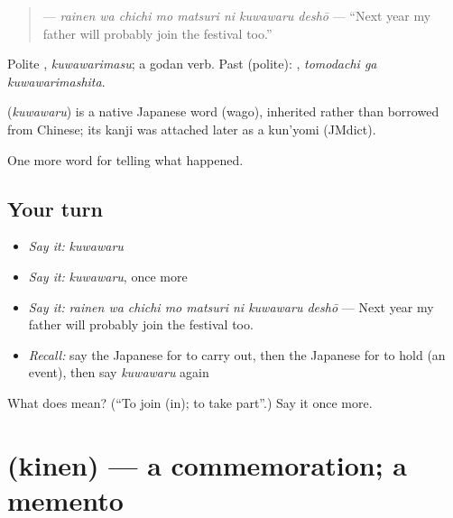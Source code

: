 \begin{quote}
\textbf{   } — \emph{rainen wa chichi mo matsuri ni kuwawaru deshō} — \textquotedblleft{}Next year my father will probably join the festival too.\textquotedblright{}
\end{quote}

Polite \textbf{}, \emph{kuwawarimasu}; a godan verb. Past (polite): \textbf{ }, \emph{tomodachi ga kuwawarimashita}.

\begin{cousinweb}
\textbf{} (\emph{kuwawaru}) is a native Japanese word (wago), inherited rather than borrowed from Chinese; its kanji was attached later as a kun'yomi (JMdict).
\end{cousinweb}

\begin{grammarlens}[title={What you've built}]
One more word for telling what happened.
\end{grammarlens}

\subsection*{Your turn}
\begin{itemize}
\raggedright
  \item \emph{Say it:} \emph{kuwawaru}
  \item \emph{Say it:} \emph{kuwawaru}, once more
  \item \emph{Say it:} \emph{rainen wa chichi mo matsuri ni kuwawaru deshō} — Next year my father will probably join the festival too.
  \item \emph{Recall:} say the Japanese for to carry out, then the Japanese for to hold (an event), then say \emph{kuwawaru} again
\end{itemize}

\begin{tcolorbox}[breakable,colback=teal!4,colframe=teal!35!black,title={Before you move on}]
What does  mean? (\textquotedblleft{}To join (in); to take part\textquotedblright{}.) Say it once more.
\end{tcolorbox}
\section[\texorpdfstring{\ja{きねん} (kinen)}{きねん (kinen)}]{ (kinen) — a commemoration; a memento}

